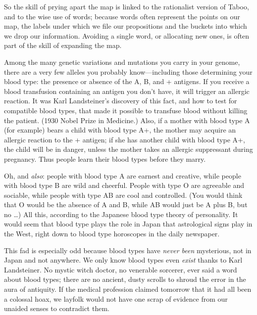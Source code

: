{
 So the skill of prying apart the map is linked to the rationalist
version of Taboo, and to the wise use of words; because words often
represent the points on our map, the labels under which we file our
propositions and the buckets into which we drop our information.
Avoiding a single word, or allocating new ones, is often part of the
skill of expanding the map.}

\myendsectiontext


{
 Among the many genetic variations and mutations you carry in your
genome, there are a very few alleles you probably know---including
those determining your blood type: the presence or absence of the A, B,
and + antigens. If you receive a blood transfusion containing an
antigen you don't have, it will trigger an allergic
reaction. It was Karl Landsteiner's discovery of this
fact, and how to test for compatible blood types, that made it possible
to transfuse blood without killing the patient. (1930 Nobel Prize in
Medicine.) Also, if a mother with blood type A (for example) bears a
child with blood type A+, the mother may acquire an allergic reaction
to the + antigen; if she has another child with blood type A+, the
child will be in danger, unless the mother takes an allergic
suppressant during pregnancy. Thus people learn their blood types
before they marry. }

{
 Oh, and \textit{also}: people with blood type A are earnest and
creative, while people with blood type B are wild and cheerful. People
with type O are agreeable and sociable, while people with type AB are
cool and controlled. (You would think that O would be the absence of A
and B, while AB would just be A plus B, but no \ldots) All this,
according to the Japanese blood type theory of personality. It would
seem that blood type plays the role in Japan that astrological signs
play in the West, right down to blood type horoscopes in the daily
newspaper.}

{
 This fad is especially odd because blood types have \textit{never
been} mysterious, not in Japan and not anywhere. We only know blood
types even \textit{exist} thanks to Karl Landsteiner. No mystic witch
doctor, no venerable sorcerer, ever said a word about blood types;
there are no ancient, dusty scrolls to shroud the error in the aura of
antiquity. If the medical profession claimed tomorrow that it had all
been a colossal hoax, we layfolk would not have one scrap of evidence
from our unaided senses to contradict them.}

